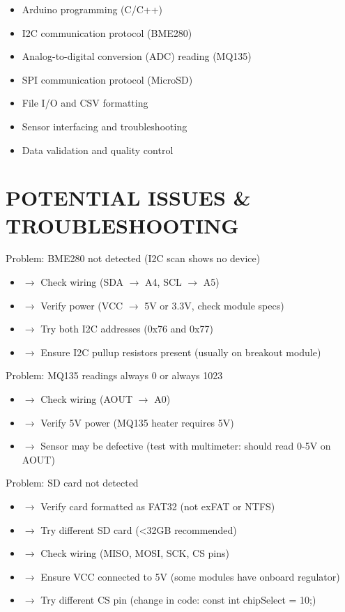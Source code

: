 \documentclass[11pt,letterpaper]{article}
\begin{document}
\begin{itemize}
  \item Arduino programming (C/C++)
  \item I2C communication protocol (BME280)
  \item Analog-to-digital conversion (ADC) reading (MQ135)
  \item SPI communication protocol (MicroSD)
  \item File I/O and CSV formatting
  \item Sensor interfacing and troubleshooting
  \item Data validation and quality control
\end{itemize}

\section{POTENTIAL ISSUES \& TROUBLESHOOTING}

Problem: BME280 not detected (I2C scan shows no device)\par

\begin{itemize}
  \item $\rightarrow$ Check wiring (SDA $\rightarrow$ A4, SCL $\rightarrow$ A5)
  \item $\rightarrow$ Verify power (VCC $\rightarrow$ 5V or 3.3V, check module specs)
  \item $\rightarrow$ Try both I2C addresses (0x76 and 0x77)
  \item $\rightarrow$ Ensure I2C pullup resistors present (usually on breakout module)
\end{itemize}

Problem: MQ135 readings always 0 or always 1023\par

\begin{itemize}
  \item $\rightarrow$ Check wiring (AOUT $\rightarrow$ A0)
  \item $\rightarrow$ Verify 5V power (MQ135 heater requires 5V)
  \item $\rightarrow$ Sensor may be defective (test with multimeter: should read 0-5V on AOUT)
\end{itemize}

Problem: SD card not detected\par

\begin{itemize}
  \item $\rightarrow$ Verify card formatted as FAT32 (not exFAT or NTFS)
  \item $\rightarrow$ Try different SD card (<32GB recommended)
  \item $\rightarrow$ Check wiring (MISO, MOSI, SCK, CS pins)
  \item $\rightarrow$ Ensure VCC connected to 5V (some modules have onboard regulator)
  \item $\rightarrow$ Try different CS pin (change in code: const int chipSelect = 10;)
\end{itemize}
\end{document}
